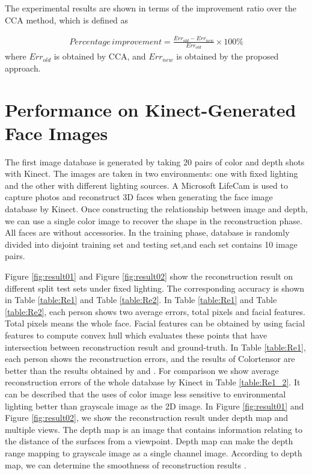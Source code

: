 The experimental results are shown in terms of the improvement ratio over the CCA method, which is defined as

\begin{align}
 \label{improvement}
 Percentage \, improvement = \frac{Err_{old} - Err_{new}}{Err_{old}} \times 100\%
\end{align} 
where $Err_{old}$ is obtained by CCA, and $Err_{new}$ is obtained by the proposed approach.

\section{Performance on Kinect-Generated Face Images}

The first image database is generated by taking 20 pairs of color and depth shots with Kinect. 
The images are taken in two environments: one with fixed lighting and the other with different lighting sources. 
A Microsoft LifeCam is used to capture photos and reconstruct 3D faces when generating the face image database by Kinect. 
Once constructing the relationship between image and depth, we can use a single color image to recover the shape in the reconstruction phase. 
All faces are without accessories. 
In the training phase, database is randomly divided into disjoint training set and testing set,and each set contains 10 image pairs.

Figure \ref{fig:result01} and Figure \ref{fig:result02} show the reconstruction result on different split test sets under fixed lighting.
The corresponding accuracy is shown in Table \ref{table:Re1} and Table \ref{table:Re2}.
In Table \ref{table:Re1} and Table \ref{table:Re2}, each person shows two average errors, total pixels and facial features. 
Total pixels means the whole face. 
Facial features can be obtained by using facial features to compute convex hull which evaluates these points that have intersection between reconstruction result and ground-truth. 
In Table \ref{table:Re1}, each person shows the reconstruction errors, and the results of Colortensor are better than the results obtained by \cite{reiter20063d} and \cite{lei2008face}.
For comparison we show average reconstruction errors of the whole database by Kinect in Table \ref{table:Re1_2}.
It can be described that the uses of color image less sensitive to environmental lighting better than grayscale image as the 2D image.
In Figure \ref{fig:result01} and Figure \ref{fig:result02}, we show the reconstruction result under depth map and multiple views. 
The depth map is an image that contains information relating to the distance of the surfaces from a viewpoint. 
Depth map can make the depth range mapping to grayscale image as a single channel image.
According to depth map, we can determine the smoothness of reconstruction results .

